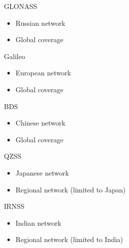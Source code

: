 \begin{frame}{GLONASS}

    \begin{itemize}
        \item Russian network
        \item Global coverage
    \end{itemize}

\end{frame}

\begin{frame}{Galileo}

    \begin{itemize}
        \item European network
        \item Global coverage
    \end{itemize}

\end{frame}

\begin{frame}{BDS}

    \begin{itemize}
        \item Chinese network
        \item Global coverage
    \end{itemize}

\end{frame}

\begin{frame}{QZSS}

    \begin{itemize}
        \item Japanese network
        \item Regional network (limited to Japan)
    \end{itemize}

\end{frame}

\begin{frame}{IRNSS}

    \begin{itemize}
        \item Indian network
        \item Regional network (limited to India)
    \end{itemize}

\end{frame}

